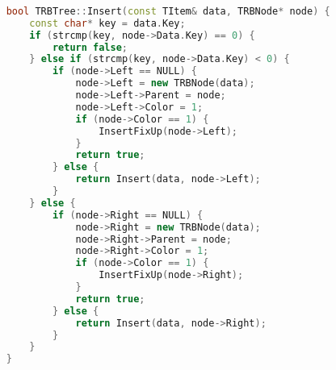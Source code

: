 \begin{lstlisting}[language=C++]
   
    bool TRBTree::Insert(const TItem& data, TRBNode* node) {
        const char* key = data.Key;
        if (strcmp(key, node->Data.Key) == 0) {
            return false;
        } else if (strcmp(key, node->Data.Key) < 0) {
            if (node->Left == NULL) {
                node->Left = new TRBNode(data);
                node->Left->Parent = node;
                node->Left->Color = 1;
                if (node->Color == 1) {
                    InsertFixUp(node->Left);
                }
                return true;
            } else {
                return Insert(data, node->Left);
            }
        } else {
            if (node->Right == NULL) {
                node->Right = new TRBNode(data);
                node->Right->Parent = node;
                node->Right->Color = 1;
                if (node->Color == 1) {
                    InsertFixUp(node->Right);
                }
                return true;
            } else {
                return Insert(data, node->Right);
            }
        }
    }


\end{lstlisting}
